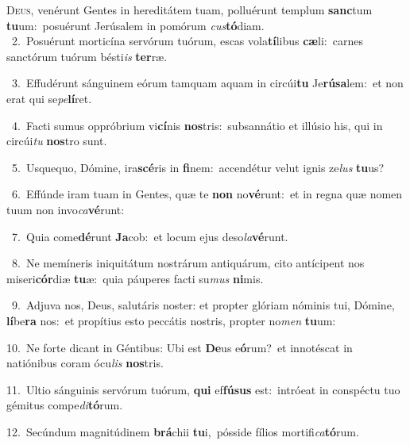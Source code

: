 \lettrine{\initial\textcolor{\initialcolor}{D}}{eus,} venérunt Gentes in hereditátem tuam, polluérunt templum \textbf{sanc}\-tum \textbf{tu}\-um:~\star posuérunt Jerúsalem in pomórum \textit{cus}\-\textbf{tó}diam.\\
{\numbfont\textcolor{\numbcolor}{~2.}}~Posuérunt morticína servórum tuórum, escas vola\-\textbf{tí}\-libus \textbf{cæ}\-li:~\star carnes sanctórum tuórum bésti\textit{is} \textbf{ter}\-ræ.\par
{\numbfont\textcolor{\numbcolor}{~3.}}~Effudérunt sánguinem eórum tamquam aquam in circúi\textbf{tu} Je\-\textbf{rú}\-\textbf{sa}lem:~\star et non erat qui se\-\textit{pe}\-\textbf{lí}ret.\par
{\numbfont\textcolor{\numbcolor}{~4.}}~Facti sumus oppróbrium vi\-\textbf{cí}\-nis \textbf{nos}\-tris:~\star subsannátio et illúsio his, qui in circúi\textit{tu} \textbf{nos}\-tro sunt.\par
{\numbfont\textcolor{\numbcolor}{~5.}}~Usquequo, Dómine, ira\-\textbf{scé}\-ris in \textbf{fi}\-nem:~\star accendétur velut ignis ze\textit{lus} \textbf{tu}\-us?\par
{\numbfont\textcolor{\numbcolor}{~6.}}~Effúnde iram tuam in Gentes, quæ te \textbf{non} no\-\textbf{vé}\-runt:~\star et in regna quæ nomen tuum non invo\-\textit{ca}\-\textbf{vé}runt:\par
{\numbfont\textcolor{\numbcolor}{~7.}}~Quia come\-\textbf{dé}\-runt \textbf{Ja}\-cob:~\star et locum ejus deso\-\textit{la}\-\textbf{vé}runt.\par
{\numbfont\textcolor{\numbcolor}{~8.}}~Ne memíneris iniquitátum nostrárum antiquárum, cito antícipent nos miseri\-\textbf{cór}\-diæ \textbf{tu}\-æ:~\star quia páuperes facti su\textit{mus} \textbf{ni}\-mis.\par
{\numbfont\textcolor{\numbcolor}{~9.}}~Adjuva nos, Deus, salutáris noster: et propter glóriam nóminis tui, Dómine, \textbf{lí}\-be\textbf{ra} nos:~\star et propítius esto peccátis nostris, propter no\textit{men} \textbf{tu}\-um:\par
{\numbfont\textcolor{\numbcolor}{10.}}~Ne forte dicant in Géntibus: Ubi est \textbf{De}\-us e\-\textbf{ó}\-rum?~\star et innotéscat in natiónibus coram ócu\textit{lis} \textbf{nos}\-tris.\par
{\numbfont\textcolor{\numbcolor}{11.}}~Ultio sánguinis servórum tuórum, \textbf{qui} ef\-\textbf{fú}\-\textbf{sus} est:~\star intróeat in conspéctu tuo gémitus compe\-\textit{di}\-\textbf{tó}rum.\par
{\numbfont\textcolor{\numbcolor}{12.}}~Secúndum magnitúdinem \textbf{brá}\-chii \textbf{tu}\-i,~\star pósside fílios mortifi\-\textit{ca}\-\textbf{tó}rum.\par

